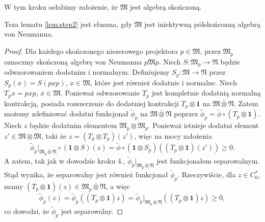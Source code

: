 W tym kroku osłabimy założenie, że $\mathfrak{M}$ jest algebrą skończoną.
\begin{Lemma}
Teza lematu \ref{lem:step2} jest słuszna, gdy
$\mathfrak{M}$ jest iniektywną półskońcozną algebrą von Neumanna.
\end{Lemma}
\begin{proof}
Dla każdego skończonego niezerowego projektora $p \in \mathfrak{M}$,
przez $\mathfrak{M}_{p}$ oznaczmy skończoną algebrę von Neumanna
$p \mathfrak{M} p$.
Niech $S : \mathfrak{M}_{p} \rightarrow \mathfrak{N}$ będzie odwzorowaniem
dodatnim i normalnym.
Definiujemy $S_{p} : \mathfrak{M} \rightarrow \mathfrak{N}$
przez $S_{p}(x) = S(pxp)$, $x \in \mathfrak{M}$,
które jest również dodatnie i normalne.
Niech $T_{p}x = p x p$, $x \in \mathfrak{M}$.
Ponieważ odwzorowanie $T_{p}$ jest kompletnie dodatnią normalną kontrakcją,
posiada rozszerzenie do dodatniej kontrakcji
$T_{p} \otimes \mathbf{1}$ na $\mathfrak{M} \bar{\otimes} \mathfrak{N}$.
Zatem możemy zdefiniować dodatni funkcjonał $\tilde{\phi}_{p}$ na
$\mathfrak{M} \bar{\otimes} \mathfrak{N}$ poprzez
$\tilde{\phi}_{p} = \tilde{\phi} \circ (T_{p} \otimes \mathbf{1})$.
Niech $z$ będzie dodatnim elementem $\mathfrak{M}_{p} \otimes \mathfrak{M}_{p}$.
Ponieważ istnieje dodatni element $z' \in \mathfrak{M} \otimes \mathfrak{M}$,
taki że $z = (T_{p} \otimes T_{p})(z')$, więc na mocy założenia
\begin{equation}
\tilde{\phi}_{p} \big|_{\mathfrak{M}_{p} \bar{\otimes} \mathfrak{N}}
\circ (\mathbf{1} \otimes S)(z) =
\tilde{\phi} \circ (\mathbf{1} \otimes S_{p})
\left( (T_{p} \otimes \mathbf{1})(z') \right ) \geq 0.
\end{equation}
A zatem, tak jak w dowodzie kroku 4.,
$\tilde{\phi}_{p} \big|_{\mathfrak{M}_{p} \bar{\otimes} \mathfrak{N}}$
jest funkcjonałem separowalnym.
Stąd wynika, że separowalny jest również funkcjonał $\tilde{\phi}_{p}$.
Rzeczywiście, dla $z\in C_{0}^{*}$, mamy
$(T_{p} \otimes \mathbf{1})(z) \in
\mathfrak{M}_{p} \bar{\otimes} \mathfrak{N}$, a więc
\begin{equation}
\tilde{\phi}_{p}(z) = \tilde{\phi}_{p}((T_{p} \otimes \mathbf{1}) z) =
\tilde{\phi}_{p} \big|_{\mathfrak{M}_{p} \bar{\otimes} \mathfrak{N}}
((T_{p} \otimes \mathbf{1}) z) \geq 0,
\end{equation}
co dowodzi, że $\tilde{\phi}_{p}$ jest separowalny.


\end{proof}

